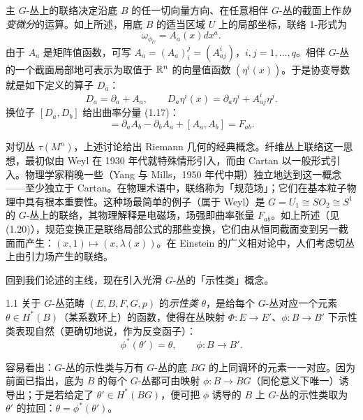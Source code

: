 主 $G$-丛上的联络决定沿底 $B$ 的任一切向量方向、在任意相伴 $G$-丛的截面上作\emph{协变微分}的运算。如上所述，用底 $B$ 的适当区域 $U$ 上的局部坐标，联络 1-形式为
\[
\omega_{\phi_U}=A_a(x)dx^a.
\]
由于 $A_a$ 是矩阵值函数，可写 $A_a=(A_a)_i^j=(A_{aj}^i)$，$i,j=1,\ldots,q$。相伴 $G$-丛的一个截面局部地可表示为取值于 $\mathbb{R}^n$ 的向量值函数 $(\eta^i(x))$。于是协变导数就是如下定义的算子 $D_a$：
\begin{equation}
D_a=\partial_a+A_a,\qquad D_a\eta^i(x)=\partial_a\eta^i+A_{aj}^i\eta^j. \tag{1.21}
\end{equation}
换位子 $[D_a,D_b]$ 给出曲率分量 (1.17)：
\begin{equation}
[D_a,D_b]=\partial_aA_b-\partial_bA_a+[A_a,A_b]=F_{ab}. \tag{1.22}
\end{equation}

对切丛 $\tau(M^n)$，上述讨论给出 Riemann 几何的经典概念。纤维丛上联络这一思想，最初似由 Weyl 在 1930 年代就特殊情形引入，而由 Cartan 以一般形式引入。物理学家稍晚一些（Yang 与 Mills，1950 年代中期）独立地达到这一概念——至少独立于 Cartan。在物理术语中，联络称为「规范场」；它们在基本粒子物理中具有根本重要性。这种场最简单的例子（属于 Weyl）是 $G=U_1\cong SO_2\cong S^1$ 的 $G$-丛上的联络，其物理解释是电磁场，场强即曲率张量 $F_{ab}$。如上所述（见 (1.20)），规范变换正是联络局部公式的那些变换，它们由从恒同截面变到另一截面而产生：$(x,1)\mapsto(x,\lambda(x))$。在 Einstein 的广义相对论中，人们考虑切丛上由引力场产生的联络。

回到我们论述的主线，现在引入光滑 $G$-丛的「示性类」概念。

\begin{definition*}{1.1}
关于 $G$-丛范畴 $(E,B,F,G,p)$ 的\emph{示性类} $\theta$，是给每个 $G$-丛对应一个元素 $\theta\in H^*(B)$（某系数环上）的函数，使得在丛映射 $\Phi:E\to E'$、$\phi:B\to B'$ 下示性类表现自然（更确切地说，作为反变函子）：
\[
\phi^*(\theta')=\theta,\qquad \phi:B\to B'.
\]
\end{definition*}

容易看出：$G$-丛的示性类与万有 $G$-丛的底 $BG$ 的上同调环的元素一一对应。因为前面已指出，底为 $B$ 的每个 $G$-丛都可由映射 $\phi:B\to BG$（同伦意义下唯一）诱导出；于是若给定了 $\theta'\in H^*(BG)$，便可把 $\phi$ 诱导的 $B$ 上 $G$-丛的示性类取为 $\theta'$ 的拉回：$\theta=\phi^*(\theta')$。

